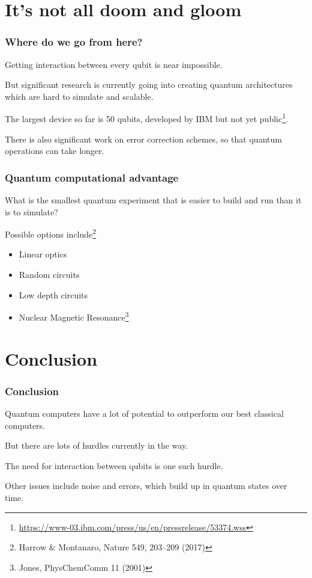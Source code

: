 \documentclass[]{beamer}
\begin{document}
\section{It's not all doom and gloom}

\begin{frame}
\frametitle{Where do we go from here?}

Getting interaction between every qubit is near impossible.

But significant research is currently going into creating quantum architectures which are hard to simulate and scalable.

The largest device so far is 50 qubits, developed by IBM but not yet public\footnote{\url{https://www-03.ibm.com/press/us/en/pressrelease/53374.wss}}.

There is also significant work on error correction schemes, so that quantum operations can take longer.
\end{frame}

\begin{frame}
\frametitle{Quantum computational advantage}

What is the smallest quantum experiment that is easier to build and run than it is to simulate?

Possible options include\footnote{Harrow \& Montanaro, Nature 549, 203–209 (2017)}
\begin{itemize}
\item Linear optics
\item Random circuits
\item Low depth circuits
\item Nuclear Magnetic Resonance\footnote{Jones, PhysChemComm 11 (2001)}
\end{itemize}
\end{frame}

\section{Conclusion}

\begin{frame}
\frametitle{Conclusion}

Quantum computers have a lot of potential to outperform our best classical computers.

But there are lots of hurdles currently in the way.

The need for interaction between qubits is one such hurdle.

Other issues include noise and errors, which build up in quantum states over time.

\end{frame}
\end{document}
